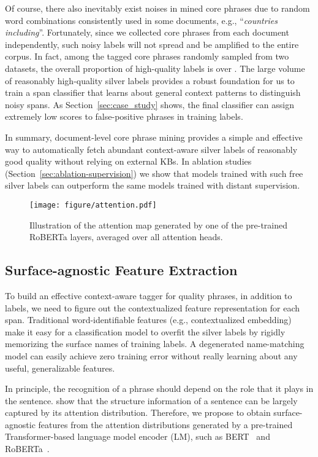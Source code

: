 \documentclass[sigconf]{acmart}
\newcommand{\eg}{\mbox{e.g.}\xspace}
\newcommand{\example}[1]{``\emph{#1}''}
\begin{document}
Of course, there also inevitably exist noises in mined core phrases due to random word combinations consistently used in some documents, \eg, \example{countries including}.
Fortunately, since we collected core phrases from each document independently, such noisy labels will not spread and be amplified to the entire corpus.
In fact, among the tagged core phrases randomly sampled from two datasets, the overall proportion of high-quality labels is over .
The large volume of reasonably high-quality silver labels provides a robust foundation for us to train a span classifier that learns about general context patterns to distinguish noisy spans.
As Section~\ref{sec:case_study} shows, the final classifier can assign extremely low scores to false-positive phrases in training labels.

In summary, document-level core phrase mining provides a simple and effective way to automatically fetch abundant context-aware silver labels of reasonably good quality without relying on external KBs.
In ablation studies (Section~\ref{sec:ablation-supervision}) we show that models trained with such free silver labels can outperform the same models trained with distant supervision.


\begin{figure}[t]
    \centering
    \texttt{[image: figure/attention.pdf]}
    \caption{
    Illustration of the attention map generated by one of the pre-trained RoBERTa layers, averaged over all attention heads.
    }\label{fig:attention}\vspace{-2mm}
\end{figure}


\subsection{Surface-agnostic Feature Extraction}
\label{sec:attentionfeature}

To build an effective context-aware tagger for quality phrases, in addition to labels, we need to figure out the contextualized feature representation for each span.
Traditional word-identifiable features (\eg, contextualized embedding) make it easy for a classification model to overfit the silver labels by rigidly memorizing the surface names of training labels.
A degenerated name-matching model can easily achieve zero training error without really learning about any useful, generalizable features.

In principle, the recognition of a phrase should depend on the role that it plays in the sentence.
\citet{kim2019pre} show that the structure information of a sentence can be largely captured by its attention distribution.
Therefore, we propose to obtain surface-agnostic features from the attention distributions generated by a pre-trained Transformer-based language model encoder (LM), such as BERT~\cite{devlin2019bert} and RoBERTa~\cite{liu2019roberta}.
\end{document}
